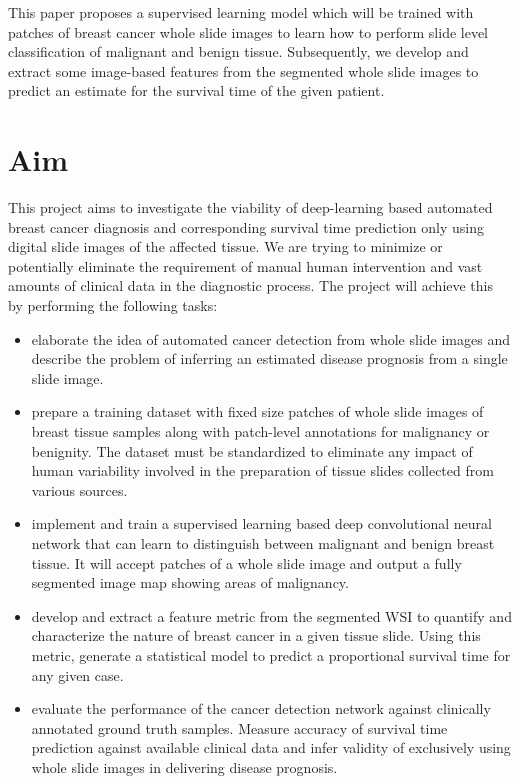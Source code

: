 \documentclass{l4proj}
\begin{document}
This paper proposes a supervised learning model which will be trained with patches of breast cancer whole slide images to learn how to perform slide level classification of malignant and benign tissue. Subsequently, we develop and extract some image-based features from the segmented whole slide images to predict an estimate for the survival time of the given patient. 



\section{Aim}
This project aims to investigate the viability of deep-learning based automated breast cancer diagnosis and corresponding survival time  prediction only using digital slide images of the affected tissue. We are trying to minimize or potentially eliminate the requirement of manual human intervention and vast amounts of clinical data in the diagnostic process. The project will achieve this by performing the following tasks:

\begin{itemize}
    \item
    elaborate the idea of automated cancer detection from whole slide images and describe the problem of inferring an estimated disease prognosis from a single slide image. 
    \item 
    prepare a training dataset with fixed size patches of whole slide images of breast tissue samples along with patch-level annotations for malignancy or benignity. The dataset must be standardized to eliminate any impact of human variability involved in the preparation of tissue slides collected from various sources.
    \item
    implement and train a supervised learning based deep convolutional neural network that can learn to distinguish between malignant and benign breast tissue. It will accept patches of a whole slide image and output a fully segmented image map showing areas of malignancy.
    \item
    develop and extract a feature metric from the segmented WSI to quantify and characterize the nature of breast cancer in a given tissue slide. Using this metric, generate a statistical model to predict a proportional survival time for any given case. 
    \item
    evaluate the performance of the cancer detection network against clinically annotated ground truth samples. Measure accuracy of survival time prediction against available clinical data and infer validity of exclusively using whole slide images in delivering disease prognosis. 
\end{itemize}
\end{document}

